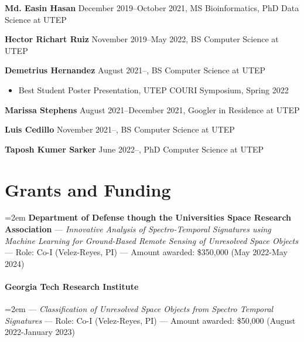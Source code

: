 \documentclass[10pt,letterpaper]{article}
\begin{document}
\textbf{Md. Easin Hasan} December 2019--October 2021, MS Bioinformatics, PhD Data Science at UTEP

\textbf{Hector Richart Ruiz} November 2019--May 2022, BS Computer Science at UTEP

\textbf{Demetrius Hernandez} August 2021--, BS Computer Science at UTEP
\begin{itemize}
\item Best Student Poster Presentation, UTEP COURI Symposium, Spring 2022 
\end{itemize}

\textbf{Marissa Stephens} August 2021--December 2021, Googler in Residence at UTEP

\textbf{Luis Cedillo} November 2021--, BS Computer Science at UTEP

\textbf{Taposh Kumer Sarker} June 2022--, PhD Computer Science at UTEP


\section*{Grants and Funding}
\hangindent=2em \textbf{Department of Defense though the Universities Space Research Association}  --- 
	\textit{Innovative Analysis of Spectro-Temporal Signatures using Machine Learning for Ground-Based Remote Sensing of Unresolved Space Objects} --- 
	Role: Co-I (Velez-Reyes, PI) --- Amount awarded: \$350,000 (May 2022-May 2024)

\paragraph{Georgia Tech Research Institute}  \hangindent=2em  --- 
	\textit{Classification of Unresolved Space Objects from Spectro Temporal Signatures} ---
	Role: Co-I (Velez-Reyes, PI) --- Amount awarded: \$50,000 (August 2022-January 2023)



\end{document}
